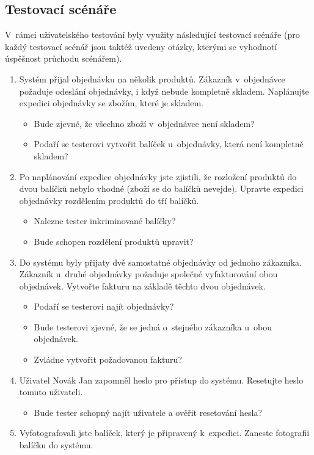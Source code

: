 \documentclass[thesis=B,czech]{FITthesis}[2012/06/26]
\begin{document}
\subsection{Testovací scénáře}
	V~rámci uživatelského testování byly využity následující testovací scénáře (pro každý testovací scénář jsou taktéž uvedeny otázky, kterými se vyhodnotí úspěšnost průchodu scénářem).
	\begin{enumerate}
		\item Systém přijal objednávku na několik produktů. Zákazník v~objednávce požaduje odeslání objednávky, i když nebude kompletně skladem. Naplánujte expedici objednávky se zbožím, které je skladem.
		\begin{itemize}
			\item Bude zjevné, že všechno zboží v~objednávce není skladem?
			\item Podaří se testerovi vytvořit balíček u~objednávky, která není kompletně skladem?
		\end{itemize}
		\item Po naplánování expedice objednávky jste zjistili, že rozložení produktů do dvou balíčků nebylo vhodné (zboží se do balíčků nevejde). Upravte expedici objednávky rozdělením produktů do tří balíčků.
		\begin{itemize}
			\item Nalezne tester inkriminované balíčky?
			\item Bude schopen rozdělení produktů upravit?
		\end{itemize}
		\item Do systému byly přijaty dvě samostatné objednávky od jednoho zákazníka. Zákazník u~druhé objednávky požaduje společné vyfakturování obou objednávek. Vytvořte fakturu na základě těchto dvou objednávek.
		\begin{itemize}
			\item Podaří se testerovi najít objednávky?
			\item Bude testerovi zjevné, že se jedná o~stejného zákazníka u~obou objednávek.
			\item Zvládne vytvořit požadovanou fakturu?
		\end{itemize}
		\item Uživatel Novák Jan zapomněl heslo pro přístup do systému. Resetujte heslo tomuto uživateli.
		\begin{itemize}
			\item Bude tester schopný najít uživatele a ověřit resetování hesla?
		\end{itemize}
		\item Vyfotografovali jste balíček, který je připravený k~expedici. Zaneste fotografii balíčku do systému.

\end{enumerate}
\end{document}
